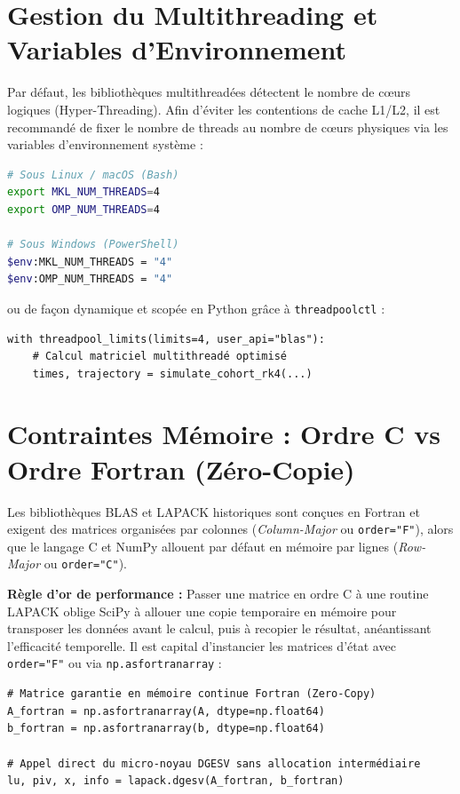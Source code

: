 \documentclass[11pt,a4paper]{report}
\theoremstyle{plain}
\theoremstyle{definition}
\theoremstyle{remark}
\begin{document}
\section{Gestion du Multithreading et Variables d'Environnement}
Par défaut, les bibliothèques multithreadées détectent le nombre de cœurs logiques (Hyper-Threading). Afin d'éviter les contentions de cache L1/L2, il est recommandé de fixer le nombre de threads au nombre de cœurs physiques via les variables d'environnement système :
\begin{lstlisting}[language=bash]
# Sous Linux / macOS (Bash)
export MKL_NUM_THREADS=4
export OMP_NUM_THREADS=4

# Sous Windows (PowerShell)
$env:MKL_NUM_THREADS = "4"
$env:OMP_NUM_THREADS = "4"
\end{lstlisting}
ou de façon dynamique et scopée en Python grâce à \texttt{threadpoolctl} :
\begin{lstlisting}
with threadpool_limits(limits=4, user_api="blas"):
    # Calcul matriciel multithreadé optimisé
    times, trajectory = simulate_cohort_rk4(...)
\end{lstlisting}

\section{Contraintes Mémoire : Ordre C vs Ordre Fortran (Zéro-Copie)}
Les bibliothèques BLAS et LAPACK historiques sont conçues en Fortran et exigent des matrices organisées par colonnes (\textit{Column-Major} ou \texttt{order="F"}), alors que le langage C et NumPy allouent par défaut en mémoire par lignes (\textit{Row-Major} ou \texttt{order="C"}).

\begin{tcolorbox}[colback=lightbg,colframe=navyblue!60,arc=3pt,boxrule=0.6pt]
\textbf{Règle d'or de performance :} Passer une matrice en ordre C à une routine LAPACK oblige SciPy à allouer une copie temporaire en mémoire pour transposer les données avant le calcul, puis à recopier le résultat, anéantissant l'efficacité temporelle. Il est capital d'instancier les matrices d'état avec \texttt{order="F"} ou via \texttt{np.asfortranarray} :
\end{tcolorbox}

\begin{lstlisting}
# Matrice garantie en mémoire continue Fortran (Zero-Copy)
A_fortran = np.asfortranarray(A, dtype=np.float64)
b_fortran = np.asfortranarray(b, dtype=np.float64)

# Appel direct du micro-noyau DGESV sans allocation intermédiaire
lu, piv, x, info = lapack.dgesv(A_fortran, b_fortran)
\end{lstlisting}
\end{document}
